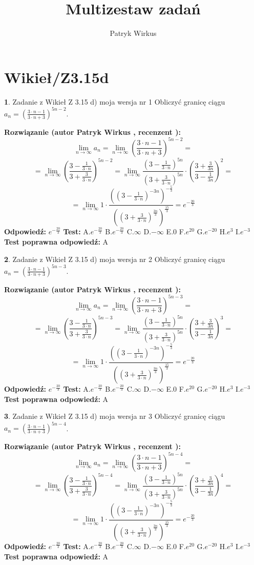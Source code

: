 \documentclass[12pt, a4paper]{article}
\title{Multizestaw zadań}
\author{Patryk Wirkus}
\date{}
\theoremstyle{definition} %
\newtheorem{zad}{}
\newcommand{\kategoria}[1]{\section{#1}}
\newcommand{\zadStart}[1]{\begin{zad}#1\newline}
\newcommand{\zadStop}{\end{zad}}
\newcommand{\rozwStart}[2]{\noindent \textbf{Rozwiązanie (autor #1 , recenzent #2): }\newline}
\newcommand{\rozwStop}{\newline}
\newcommand{\odpStart}{\noindent \textbf{Odpowiedź:}\newline}
\newcommand{\odpStop}{\newline}
\newcommand{\testStart}{\noindent \textbf{Test:}\newline}
\newcommand{\testStop}{\newline}
\newcommand{\kluczStart}{\noindent \textbf{Test poprawna odpowiedź:}\newline}
\newcommand{\kluczStop}{\newline}
\begin{document}
\maketitle

\kategoria{Wikieł/Z3.15d}


\zadStart{Zadanie z Wikieł Z 3.15 d) moja wersja nr 1}
Obliczyć granicę ciągu $a_{n}=(\frac{3\cdot n - 1}{3 \cdot n + 3})^{5n-2}$.
\zadStop
\rozwStart{Patryk Wirkus}{}
$$\lim\limits_{n\to\infty} a_{n} = \lim\limits_{n\to\infty}(\frac{3\cdot n - 1}{3 \cdot n + 3})^{5n-2}=$$
$$=\lim\limits_{n\to\infty}(\frac{3 - \frac{1}{3\cdot n}}{3 + \frac{3}{3 \cdot n}})^{5n-2}=\lim\limits_{n\to\infty}\frac{(3 - \frac{1}{3\cdot n})^{5n}}{(3 + \frac{3}{3\cdot n})^{5n}} \cdot (\frac{3+\frac{3}{3n}}{3-\frac{1}{3n}})^{2}=$$
$$=\lim\limits_{n\to\infty} 1 \cdot \frac{((3-\frac{1}{3 \cdot n})^{-3n})^{-\frac{5}{3}}}{((3+\frac{3}{3 \cdot n})^{\frac{3n}{3}})^{\frac{15}{3}}} =e^{-\frac{20}{3}}$$
\rozwStop
\odpStart
$e^{-\frac{20}{3}}$
\odpStop
\testStart
A.$ e^{-\frac{20}{3}}$
B.$ e^{-\frac{20}{3}}$
C.$\infty$
D.$-\infty$
E.$0$
F.$e^{20}$
G.$e^{-20}$
H.$e^{3}$
I.$e^{-3}$
\testStop
\kluczStart
A
\kluczStop



\zadStart{Zadanie z Wikieł Z 3.15 d) moja wersja nr 2}
Obliczyć granicę ciągu $a_{n}=(\frac{3\cdot n - 1}{3 \cdot n + 3})^{5n-3}$.
\zadStop
\rozwStart{Patryk Wirkus}{}
$$\lim\limits_{n\to\infty} a_{n} = \lim\limits_{n\to\infty}(\frac{3\cdot n - 1}{3 \cdot n + 3})^{5n-3}=$$
$$=\lim\limits_{n\to\infty}(\frac{3 - \frac{1}{3\cdot n}}{3 + \frac{3}{3 \cdot n}})^{5n-3}=\lim\limits_{n\to\infty}\frac{(3 - \frac{1}{3\cdot n})^{5n}}{(3 + \frac{3}{3\cdot n})^{5n}} \cdot (\frac{3+\frac{3}{3n}}{3-\frac{1}{3n}})^{3}=$$
$$=\lim\limits_{n\to\infty} 1 \cdot \frac{((3-\frac{1}{3 \cdot n})^{-3n})^{-\frac{5}{3}}}{((3+\frac{3}{3 \cdot n})^{\frac{3n}{3}})^{\frac{15}{3}}} =e^{-\frac{20}{3}}$$
\rozwStop
\odpStart
$e^{-\frac{20}{3}}$
\odpStop
\testStart
A.$ e^{-\frac{20}{3}}$
B.$ e^{-\frac{20}{3}}$
C.$\infty$
D.$-\infty$
E.$0$
F.$e^{20}$
G.$e^{-20}$
H.$e^{3}$
I.$e^{-3}$
\testStop
\kluczStart
A
\kluczStop



\zadStart{Zadanie z Wikieł Z 3.15 d) moja wersja nr 3}
Obliczyć granicę ciągu $a_{n}=(\frac{3\cdot n - 1}{3 \cdot n + 3})^{5n-4}$.
\zadStop
\rozwStart{Patryk Wirkus}{}
$$\lim\limits_{n\to\infty} a_{n} = \lim\limits_{n\to\infty}(\frac{3\cdot n - 1}{3 \cdot n + 3})^{5n-4}=$$
$$=\lim\limits_{n\to\infty}(\frac{3 - \frac{1}{3\cdot n}}{3 + \frac{3}{3 \cdot n}})^{5n-4}=\lim\limits_{n\to\infty}\frac{(3 - \frac{1}{3\cdot n})^{5n}}{(3 + \frac{3}{3\cdot n})^{5n}} \cdot (\frac{3+\frac{3}{3n}}{3-\frac{1}{3n}})^{4}=$$
$$=\lim\limits_{n\to\infty} 1 \cdot \frac{((3-\frac{1}{3 \cdot n})^{-3n})^{-\frac{5}{3}}}{((3+\frac{3}{3 \cdot n})^{\frac{3n}{3}})^{\frac{15}{3}}} =e^{-\frac{20}{3}}$$
\rozwStop
\odpStart
$e^{-\frac{20}{3}}$
\odpStop
\testStart
A.$ e^{-\frac{20}{3}}$
B.$ e^{-\frac{20}{3}}$
C.$\infty$
D.$-\infty$
E.$0$
F.$e^{20}$
G.$e^{-20}$
H.$e^{3}$
I.$e^{-3}$
\testStop
\kluczStart
A
\kluczStop
\end{document}
